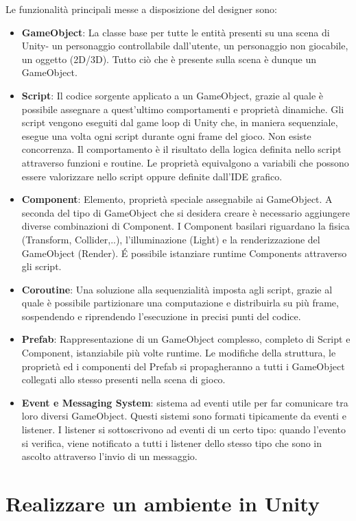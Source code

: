 Le funzionalità principali messe a disposizione del designer sono:
\begin{itemize}
	\item \textbf{GameObject}: La classe base per tutte le entità presenti su una scena di Unity- un personaggio controllabile dall'utente, un personaggio non giocabile, un oggetto (2D/3D). Tutto ciò che è presente sulla scena è dunque un GameObject.
	\item \textbf{Script}: Il codice sorgente applicato a un GameObject, grazie al quale è possibile assegnare a quest'ultimo comportamenti e proprietà dinamiche. Gli script vengono eseguiti dal game loop di Unity che, in maniera sequenziale, esegue una volta ogni script durante ogni frame del gioco. Non esiste concorrenza. Il comportamento è il risultato della logica definita nello script attraverso funzioni e routine. Le proprietà equivalgono a variabili che possono essere valorizzare nello script oppure definite dall'IDE grafico.
	\item \textbf{Component}: Elemento, proprietà speciale assegnabile ai GameObject. A seconda del tipo di GameObject che si desidera creare è necessario aggiungere diverse combinazioni di Component. I Component basilari riguardano la fisica (Transform, Collider,..), l'illuminazione (Light) e la renderizzazione del GameObject (Render). \'E possibile istanziare runtime Components attraverso gli script.
	\item \textbf{Coroutine}: Una soluzione alla sequenzialità imposta agli script, grazie al quale è possibile partizionare una computazione e distribuirla su più frame, sospendendo e riprendendo l'esecuzione in precisi punti del codice.
	\item \textbf{Prefab}: Rappresentazione di un GameObject complesso, completo di Script e Component, istanziabile più volte runtime. Le modifiche della struttura, le proprietà ed i componenti del Prefab si propagheranno a tutti i GameObject collegati allo stesso presenti nella scena di gioco.
	\item \textbf{Event e Messaging System}: sistema ad eventi utile per far comunicare tra loro diversi GameObject. Questi sistemi sono formati tipicamente da eventi e listener. I listener si sottoscrivono ad eventi di un certo tipo: quando l'evento si verifica, viene notificato a tutti i listener dello stesso tipo che sono in ascolto attraverso l'invio di un messaggio.
\end{itemize}

\section{Realizzare un ambiente in Unity} \label{ambiente_unity}

